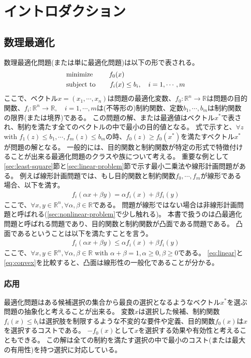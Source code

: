 \documentclass[a4paper, 10pt, uplatex]{jsreport}
\begin{document}
\chapter{イントロダクション}
\section{数理最適化}
数理最適化問題(または単に最適化問題)は以下の形で表される。
\begin{alignat}{2}
    &\text{minimize}   & \quad f_0(x) & \notag \\
    &\text{subject to} & \quad f_i(x) & \leq b_i, \quad i = 1,\cdots,m \label{eq:convex-define}
\end{alignat}
ここで、ベクトル$x = (x_1, \cdots, x_n)$は問題の最適化変数、$f_0 : \mathbb{R}^n \rightarrow \mathbb{R}$は問題の目的関数、$f_i : \mathbb{R}^n \rightarrow \mathbb{R}, \quad i = 1,\cdots,m$は(不等形の)制約関数、定数$b_1,\cdots,b_m$は制約関数の限界(または境界)である。
この問題の解、または最適値はベクトル$x^*$で表され、制約を満たす全てのベクトルの中で最小の目的値となる。
式で示すと、$\forall z$ with $f_1(z) \leq b_1, \cdots, f_m(z) \leq b_m$の時、$f_0(z) \geq f_0(x^*)$を満たすベクトル$x^*$が問題の解となる。
一般的には、目的関数と制約関数が特定の形式で特徴付けることが出来る最適化問題のクラスや族について考える。
重要な例として\ref{sec:least-square}節と\ref{sec:linear-problem}節で示す最小二乗法や線形計画問題がある。
例えば線形計画問題では、もし目的関数と制約関数$f_0,\cdots,f_m$が線形である場合、以下を満す。
\begin{align}
    f_i(\alpha x+\beta y) = \alpha f_i(x) + \beta f_i(y) \label{eq:linear}
\end{align}
ここで、$\forall x, y \in \mathbb{R}^n, \forall \alpha, \beta \in \mathbb{R}$である。
問題が線形ではない場合は非線形計画問題と呼ばれる(\ref{sec:nonlinear-problem}で少し触れる)。
本書で扱うのは凸最適化問題と呼ばれる問題であり、目的関数と制約関数が凸面である問題である。
凸面であるということは以下を満たすことを言う。
\begin{align}
    f_i(\alpha x+\beta y) \leq \alpha f_i(x) + \beta f_i(y) \label{eq:convex}
\end{align}
ここで、$\forall x, y \in \mathbb{R}^n, \forall \alpha, \beta \in \mathbb{R}$ with $\alpha + \beta = 1, \alpha \geq 0, \beta \geq 0$である。
\eqref{eq:linear}と\eqref{eq:convex}を比較すると、凸面は線形性の一般化であることが分かる。

\subsection{応用}
最適化問題はある候補選択の集合から最良の選択となるようなベクトル$x^*$を選ぶ問題の抽象化と考えることが出来る。
変数$x$は選択した候補、制約関数$f_i(x) \leq b_i$は選択肢を制限するような不変的な要件や定義、目的関数$f_0(x)$は$x$を選択するコストである。
$-f_0(x)$として$x$を選択する効果や有効性と考えることもできる。
この解は全ての制約を満たす選択の中で最小のコスト(または最大の有用性)を持つ選択に対応している。
\end{document}
